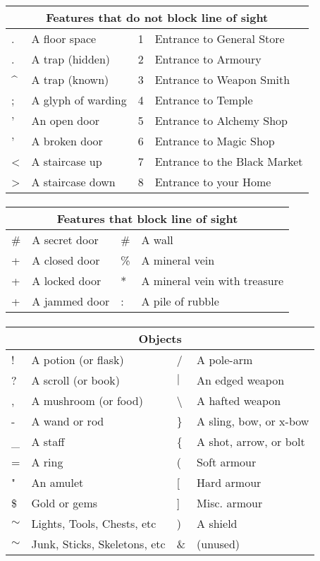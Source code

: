 \paragraph{}
\begin{tabular}{|ll|ll|}
\hline
\multicolumn{4}{|c|}{Features that do not block line of sight}\\
\hline
.&A floor space&1&Entrance to General Store\\
.&A trap (hidden)&2&Entrance to Armoury\\
\^{}&A trap (known)&3&Entrance to Weapon Smith\\
;&A glyph of warding&4&Entrance to Temple\\
'&An open door&5&Entrance to Alchemy Shop\\
'&A broken door&6&Entrance to Magic Shop\\
<&A staircase up&7&Entrance to the Black Market\\
>&A staircase down&8&Entrance to your Home\\
\hline
\end{tabular}

\paragraph{}
\begin{tabular}{|ll|ll|}
\hline
\multicolumn{4}{|c|}{Features that block line of sight}\\
\hline
\#&A secret door&\#&A wall\\
+&A closed door&\%&A mineral vein\\
+&A locked door&*&A mineral vein with treasure\\
+&A jammed door&:&A pile of rubble\\
\hline
\end{tabular}

\paragraph{}
\begin{tabular}{|ll|ll|}
\hline
\multicolumn{4}{|c|}{Objects}\\
\hline
!&A potion (or flask)&/&A pole-arm\\
?&A scroll (or book)&$|$&An edged weapon\\
,&A mushroom (or food)&\textbackslash &A hafted weapon\\
-&A wand or rod&\}&A sling, bow, or x-bow\\
\_&A staff&\{&A shot, arrow, or bolt\\
=&A ring&(&Soft armour\\
"&An amulet&[&Hard armour\\
\$&Gold or gems&]&Misc. armour\\
$\sim$&Lights, Tools, Chests, etc&)&A shield\\
$\sim$&Junk, Sticks, Skeletons, etc&\&&(unused)\\
\hline
\end{tabular}

